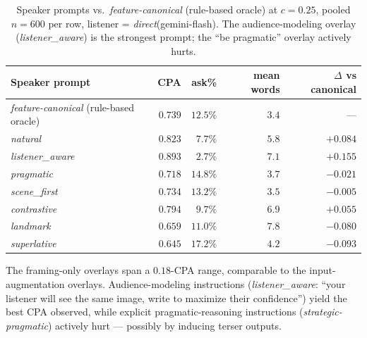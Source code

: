 \documentclass[11pt]{article}
\begin{document}
\begin{table}[H]
\centering
\small
\setlength{\tabcolsep}{4pt}
\begin{tabular}{lrrrr}
\toprule
Speaker prompt & CPA & ask\% & mean words & $\Delta$ vs canonical \\
\midrule
\textit{feature-canonical} (rule-based oracle) & $0.739$ & $12.5\%$ & $3.4$ & --- \\
\midrule
\textit{natural}         & $0.823$ & $\phantom{0}7.7\%$ & $5.8$ & $+0.084$ \\
\textit{listener\_aware} & $\mathbf{0.893}$ & $\phantom{0}2.7\%$ & $7.1$ & $+0.155$ \\
\textit{pragmatic}       & $0.718$ & $14.8\%$ & $3.7$ & $-0.021$ \\
\textit{scene\_first}    & $0.734$ & $13.2\%$ & $3.5$ & $-0.005$ \\
\textit{contrastive}     & $0.794$ & $\phantom{0}9.7\%$ & $6.9$ & $+0.055$ \\
\textit{landmark}        & $0.659$ & $11.0\%$ & $7.8$ & $-0.080$ \\
\textit{superlative}     & $0.645$ & $17.2\%$ & $4.2$ & $-0.093$ \\
\bottomrule
\end{tabular}
\caption{Speaker prompts vs.\ \textit{feature-canonical} (rule-based
oracle) at $c{=}0.25$, pooled $n{=}600$ per row, listener =
\textit{direct}(gemini-flash). The audience-modeling overlay
(\textit{listener\_aware}) is the strongest prompt; the
``be pragmatic'' overlay actively hurts.}
\label{tab:c-prompts}
\end{table}

The framing-only overlays span a $0.18$-CPA range, comparable to the
input-augmentation overlays. Audience-modeling instructions
(\textit{listener\_aware}: ``your listener will see the same image,
write to maximize their confidence'') yield the best CPA observed,
while explicit pragmatic-reasoning instructions
(\textit{strategic-pragmatic}) actively hurt --- possibly by inducing
terser outputs.
\end{document}
